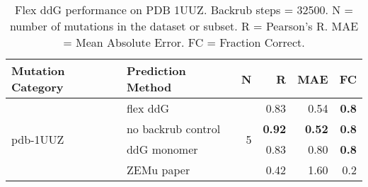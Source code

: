\begin{table}
  \begin{tabular}{llrrrr}
\toprule
Mutation Category &   Prediction Method &  N &    R &  MAE &  FC \\
\midrule
 \multirow{ 4}{*}{pdb-1UUZ} & flex ddG & \multirow{ 4}{*}{5} & 0.83 & 0.54 & \textbf{0.8}  \\
 & no backrub control & & \textbf{0.92} & \textbf{0.52} & \textbf{0.8}  \\
 & ddG monomer & & 0.83 & 0.80 & \textbf{0.8}  \\
 & ZEMu paper & & 0.42 & 1.60 & 0.2  \\
\bottomrule
\end{tabular}
  \caption[Flex ddG performance on PDB 1UUZ]{
    Flex ddG performance on PDB 1UUZ. Backrub steps = 32500. N = number of mutations in the dataset or subset. R = Pearson's R. MAE = Mean Absolute Error. FC = Fraction Correct.
  } \label{tab:table-pdb-1UUZ}
\end{table}
